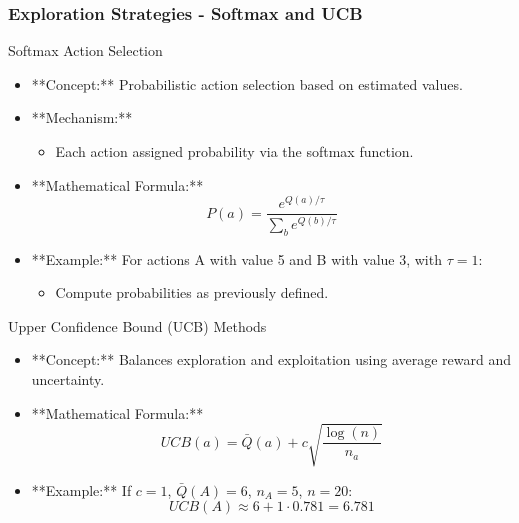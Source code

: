 \documentclass[aspectratio=169]{beamer}
\begin{document}
\begin{frame}[fragile]
    \frametitle{Exploration Strategies - Softmax and UCB}
    \begin{block}{Softmax Action Selection}
        \begin{itemize}
            \item **Concept:** Probabilistic action selection based on estimated values.
            \item **Mechanism:**
            \begin{itemize}
                \item Each action assigned probability via the softmax function.
            \end{itemize}
            \item **Mathematical Formula:**
            \begin{equation}
                P(a) = \frac{e^{Q(a) / \tau}}{\sum_{b} e^{Q(b) / \tau}}
            \end{equation}
            \item **Example:** For actions A with value 5 and B with value 3, with $\tau = 1$:
            \begin{itemize}
                \item Compute probabilities as previously defined.
            \end{itemize}
        \end{itemize}
    \end{block}
    
    \begin{block}{Upper Confidence Bound (UCB) Methods}
        \begin{itemize}
            \item **Concept:** Balances exploration and exploitation using average reward and uncertainty.
            \item **Mathematical Formula:**
            \begin{equation}
                UCB(a) = \bar{Q}(a) + c \sqrt{\frac{\log(n)}{n_a}}
            \end{equation}
            \item **Example:** If $c = 1$, $\bar{Q}(A) = 6$, $n_A = 5$, $n = 20$:
            \begin{equation}
                UCB(A) \approx 6 + 1 \cdot 0.781 = 6.781
            \end{equation}
        \end{itemize}
    \end{block}
\end{frame}
\end{document}
